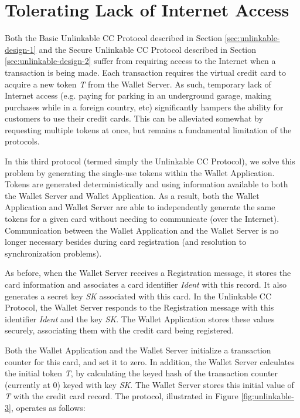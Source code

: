 \section{Tolerating Lack of Internet Access}
\label{unlinkable-design-3}

Both the Basic Unlinkable CC Protocol described in Section \ref{sec:unlinkable-design-1}
    and the Secure Unlinkable CC Protocol described in Section \ref{sec:unlinkable-design-2}
    suffer from requiring access to the Internet when a transaction is being made.
Each transaction requires the virtual credit card to acquire a new token \emph{T} from the Wallet Server.
As such, temporary lack of Internet access
    (e.g. paying for parking in an underground garage, making purchases while in a foreign country, etc)
    significantly hampers the ability for customers to use their credit cards.
This can be alleviated somewhat by requesting multiple tokens at once, but remains a fundamental limitation of the protocols.

In this third protocol (termed simply the Unlinkable CC Protocol), we solve this problem by generating the single-use tokens within the Wallet Application.
Tokens are generated deterministically and using information available to both the Wallet Server and Wallet Application.
As a result, both the Wallet Application and Wallet Server are able to independently generate the same tokens for a given card without needing to communicate
    (over the Internet).
Communication between the Wallet Application and the Wallet Server is no longer necessary besides during card registration (and resolution to synchronization problems).

As before, when the Wallet Server receives a Registration message, it stores the card information and associates a card identifier \emph{Ident} with this record.
It also generates a secret key \emph{SK} associated with this card.
In the Unlinkable CC Protocol, the Wallet Server responds to the Registration message with this identifier \emph{Ident} and the key \emph{SK}.
The Wallet Application stores these values securely, associating them with the credit card being registered.

Both the Wallet Application and the Wallet Server initialize a transaction counter for this card, and set it to zero.
In addition, the Wallet Server calculates the initial token \emph{T}, by calculating the keyed hash of the transaction counter (currently at 0) keyed with key \emph{SK}.
The Wallet Server stores this initial value of \emph{T} with the credit card record.
The protocol, illustrated in Figure \ref{fig:unlinkable-3}, operates as follows:

